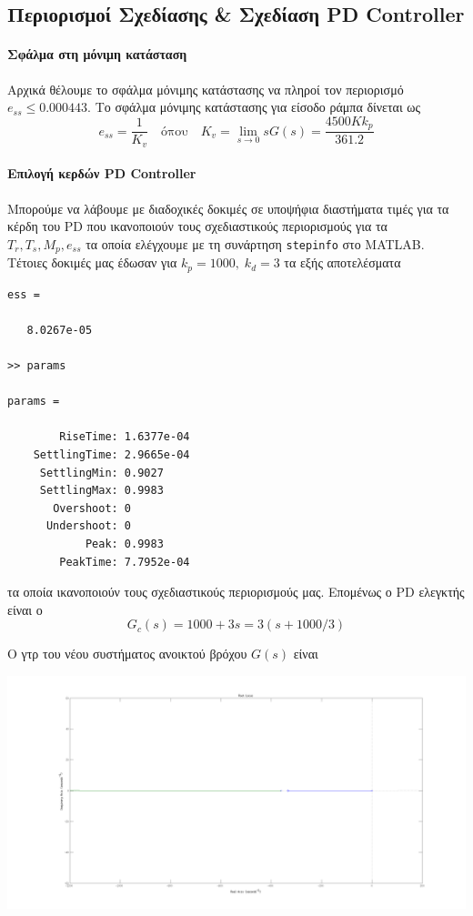 \documentclass[a4paper,oneside, 10pt]{article}
\begin{document}
\subsection*{Περιορισμοί Σχεδίασης \& Σχεδίαση PD Controller} 


\paragraph{Σφάλμα στη μόνιμη κατάσταση} Αρχικά θέλουμε το σφάλμα μόνιμης κατάστασης να πληροί τον περιορισμό $e_{ss} \le 0.000443$. Το σφάλμα μόνιμης κατάστασης για είσοδο ράμπα δίνεται ως $$e_{ss} = \frac 1 {K_v}  \quad \mathrm{όπου} \quad K_v = \lim_{s \to 0} sG(s) = \frac {4500Kk_p} {361.2}$$ 

\paragraph{Επιλογή κερδών PD Controller} 
Μπορούμε να λάβουμε με διαδοχικές δοκιμές σε υποψήφια διαστήματα τιμές για τα κέρδη του PD που ικανοποιούν τους σχεδιαστικούς περιορισμούς για τα $T_r, T_s, M_p, e_{ss}$ τα οποία ελέγχουμε με τη συνάρτηση \texttt{stepinfo} στο MATLAB. Τέτοιες δοκιμές μας έδωσαν για $k_p = 1000, \; k_d = 3$ τα εξής αποτελέσματα
\begin{verbatim}
ess =

   8.0267e-05

>> params

params = 

        RiseTime: 1.6377e-04
    SettlingTime: 2.9665e-04
     SettlingMin: 0.9027
     SettlingMax: 0.9983
       Overshoot: 0
      Undershoot: 0
            Peak: 0.9983
        PeakTime: 7.7952e-04

\end{verbatim}  

τα οποία ικανοποιούν τους σχεδιαστικούς περιορισμούς μας. Επομένως ο PD ελεγκτής είναι ο $$G_c(s) = 1000 + 3s = 3 (s + 1000 / 3)$$

Ο γτρ του νέου συστήματος ανοικτού βρόχου $G(s)$ είναι

\includegraphics[width=\textwidth]{pd_rlocus.png}
 
\end{document}
